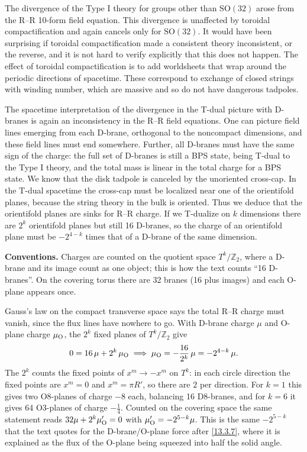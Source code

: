 The divergence of the Type I theory for groups other than $\mathrm{SO}(32)$ arose from the R--R 10-form field equation. This divergence is unaffected by toroidal compactification and again cancels only for $\mathrm{SO}(32)$. It would have been surprising if toroidal compactification made a consistent theory inconsistent, or the reverse, and it is not hard to verify explicitly that this does not happen. The effect of toroidal compactification is to add worldsheets that wrap around the periodic directions of spacetime. These correspond to exchange of closed strings with winding number, which are massive and so do not have dangerous tadpoles.

The spacetime interpretation of the divergence in the T-dual picture with D-branes is again an inconsistency in the R--R field equations. One can picture field lines emerging from each D-brane, orthogonal to the noncompact dimensions, and these field lines must end somewhere. Further, all D-branes must have the same sign of the charge: the full set of D-branes is still a BPS state, being T-dual to the Type I theory, and the total mass is linear in the total charge for a BPS state. We know that the disk tadpole is canceled by the unoriented cross-cap. In the T-dual spacetime the cross-cap must be localized near one of the orientifold planes, because the string theory in the bulk is oriented. Thus we deduce that the orientifold planes are sinks for R--R charge. If we T-dualize on $k$ dimensions there are $2^k$ orientifold planes but still 16 D-branes, so the charge of an orientifold plane must be $-2^{4-k}$ times that of a D-brane of the same dimension.
\begin{tcolorbox}[breakable]
	\begin{remark}
		\textbf{Conventions.} Charges are counted on the quotient space $T^k/\mathbb Z_2$, where a D-brane and its image count as one object; this is how the text counts ``16 D-branes''. On the covering torus there are 32 branes (16 plus images) and each O-plane appears once.

		Gauss's law on the compact transverse space says the total R--R charge must vanish, since the flux lines have nowhere to go. With D-brane charge $\mu$ and O-plane charge $\mu_{\rm O}$, the $2^k$ fixed planes of $T^k/\mathbb Z_2$ give
		\begin{align*}
			0 = 16\,\mu + 2^k\,\mu_{\rm O} \;\Longrightarrow\; \mu_{\rm O} = -\frac{16}{2^k}\,\mu = -2^{4-k}\,\mu .
		\end{align*}
		The $2^k$ counts the fixed points of $x^m\to-x^m$ on $T^k$: in each circle direction the fixed points are $x^m=0$ and $x^m=\pi R'$, so there are $2$ per direction. For $k=1$ this gives two O8-planes of charge $-8$ each, balancing 16 D8-branes, and for $k=6$ it gives 64 O3-planes of charge $-\frac14$. Counted on the covering space the same statement reads $32\mu+2^k\mu'_{\rm O}=0$ with $\mu'_{\rm O}=-2^{5-k}\mu$. This is the same $-2^{5-k}$ that the text quotes for the D-brane/O-plane force after \eqref{13.3.7}, where it is explained as the flux of the O-plane being squeezed into half the solid angle.
	\end{remark}
\end{tcolorbox}

